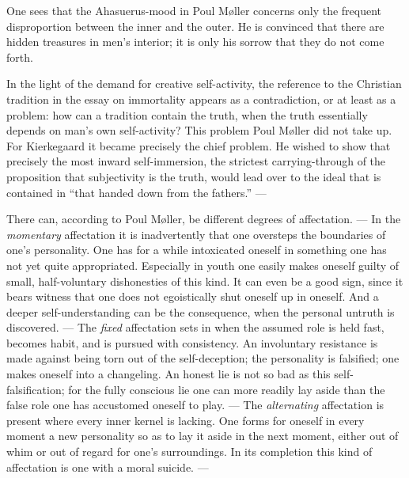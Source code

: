 \documentclass[12pt,a4paper]{book}
\newcommand{\opage}[1]{\marginnote{\footnotesize\textit{[#1]}}}
\begin{document}
One sees that the Ahasuerus-mood in Poul Møller concerns only the frequent disproportion
between the inner and the outer. He is convinced that there are hidden treasures in men's
interior; it is only his sorrow that they do not come forth.

In the light of the demand for creative self-activity, the reference to the Christian
tradition in the essay on immortality appears as a contradiction, or at least as a problem:
how can a tradition contain the truth, when the truth essentially depends on man's own
self-activity? This problem Poul Møller did not take up. For Kierkegaard it became precisely
the chief problem. He wished to show that precisely the most inward self-immersion, the
strictest carrying-through of the proposition that subjectivity is the truth, would lead over
to the ideal that is contained in ``that handed down from the fathers.'' ---

There can, according to Poul Møller, be different degrees of affectation. --- In the
\emph{momentary} affectation it is \opage{126}inadvertently that one oversteps the boundaries of one's
personality. One has for a while intoxicated oneself in something one has not yet quite
appropriated. Especially in youth one easily makes oneself guilty of small, half-voluntary
dishonesties of this kind. It can even be a good sign, since it bears witness that one does
not egoistically shut oneself up in oneself. And a deeper self-understanding can be the
consequence, when the personal untruth is discovered. --- The \emph{fixed} affectation sets
in when the assumed role is held fast, becomes habit, and is pursued with consistency. An
involuntary resistance is made against being torn out of the self-deception; the personality
is falsified; one makes oneself into a changeling. An honest lie is not so bad as this
self-falsification; for the fully conscious lie one can more readily lay aside than the false
role one has accustomed oneself to play. --- The \emph{alternating} affectation is present
where every inner kernel is lacking. One forms for oneself in every moment a new personality
so as to lay it aside in the next moment, either out of whim or out of regard for one's
surroundings. In its completion this kind of affectation is one with a moral suicide. ---
\end{document}
